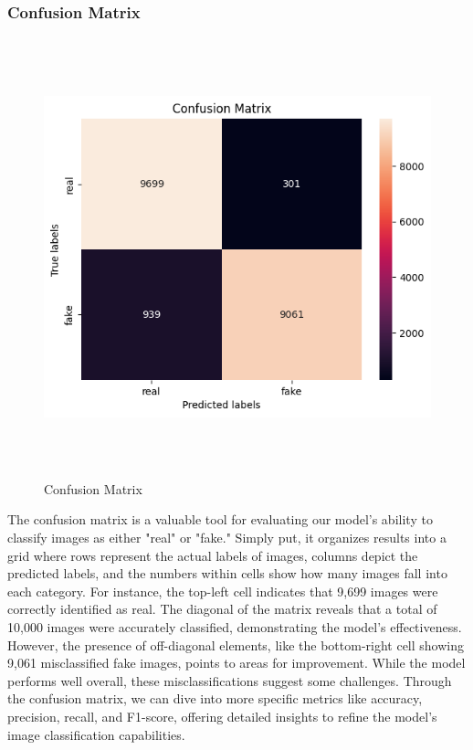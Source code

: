 \subsubsection{Confusion Matrix}
\begin{figure}[ht]
    \centering
    \includegraphics[width=5in, height =5in ]{img/confusionMatrixImage.png}
    \caption{{Confusion Matrix }}
\end{figure}
The confusion matrix is a valuable tool for evaluating our model's ability to classify images as either "real" or "fake." Simply put, it organizes results into a grid where rows represent the actual labels of images, columns depict the predicted labels, and the numbers within cells show how many images fall into each category. For instance, the top-left cell indicates that 9,699 images were correctly identified as real. The diagonal of the matrix reveals that a total of 10,000 images were accurately classified, demonstrating the model's effectiveness. However, the presence of off-diagonal elements, like the bottom-right cell showing 9,061 misclassified fake images, points to areas for improvement. While the model performs well overall, these misclassifications suggest some challenges. Through the confusion matrix, we can dive into more specific metrics like accuracy, precision, recall, and F1-score, offering detailed insights to refine the model's image classification capabilities.
\newpage
